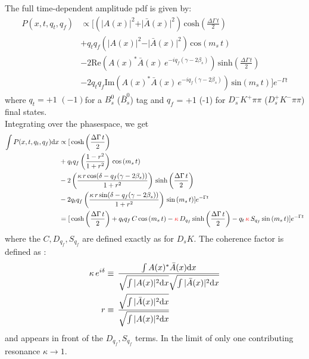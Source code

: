 The full time-dependent amplitude pdf is given by:
\begin{equation}
\begin{split}
\label{eq:PDF_full}
	P(x,t,q_t,q_f) &\propto  [
	 \left( \vert A(x) \vert^2 + \vert \bar A(x) \vert^2 \right) \, \text{cosh} \left( \frac{\Delta \Gamma \, t}{2}\right) \\
	 & + q_t q_f \left( \vert A(x) \vert^2 - \vert \bar A(x) \vert^2 \right) \, \text{cos} \left( m_s \, t \right)  \\
	 & -2 \text{Re}\left( A(x)^{*}  \bar A(x) \, e^{-i q_f (\gamma - 2\beta_s)}  \right) \, \text{sinh} \left( \frac{\Delta \Gamma \, t}{2}\right)  \\
	 & -2 q_t q_f \text{Im}\left( A(x)^{*}  \bar A(x) \, e^{-i q_f (\gamma - 2\beta_s)}  \right)\, \text{sin} \left( m_s \, t \right)  ]  e^{- \Gamma t}
\end{split}
\end{equation}
where $q_t = +1$ $(-1) $for a $B_s^{0}$ ($\bar B_s^{0}$) tag and 
$q_f$ = +1 $ $(-1) for $D_s^{-} K^{+} \pi\pi$ ($D_s^{+} K^{-} \pi\pi$) final states. \\

Integrating over the phasespace, we get
\begin{equation}
\begin{split}
\label{eq:PDF_intX}
	\int P(x,t,q_t,q_f) \text d x &\propto   [
	\, \text{cosh} \left( \frac{\Delta \Gamma \, t}{2}\right) \\
	 & + q_t q_f \left( \frac{1-r^2}{1+r^2} \right) \, \text{cos} \left( m_s \, t \right)  \\
	 & -2 \left( \frac{\kappa \, r \, \text{cos}(\delta - q_f(\gamma - 2 \beta_s))}{1+r^2}  \right) \, \text{sinh} \left( \frac{\Delta \Gamma \, t}{2}\right)  \\
	 & -2 q_t q_f \left( \frac{\kappa \, r \, \text{sin}(\delta - q_f(\gamma - 2 \beta_s))}{1+r^2}   \right)\, \text{sin} \left( m_s \, t \right)  ]  e^{- \Gamma t} \\
	 &=   [
	\, \text{cosh} \left( \frac{\Delta \Gamma \, t}{2}\right) 
	  + q_t q_f \, C \, \text{cos} \left( m_s \, t \right)  
	  - \textcolor{red}{\kappa} \, D_{q_f} \, \text{sinh} \left( \frac{\Delta \Gamma \, t}{2}\right)  
	  - q_t \, \textcolor{red}{\kappa} \, S_{q_f}\, \text{sin} \left( m_s \, t \right)  ]  e^{- \Gamma t}
\end{split}
\end{equation}
where the $C,D_{q_f},S_{q_f}$ are defined exactly as for $D_s K$.
The coherence factor is defined as :
\begin{align}
\label{eq:coherenceFactor}
	\kappa \, e^{i\delta} &\equiv \, \frac{\int A(x)^{*}  \bar A(x)  \text d x}{\sqrt{\int \vert A(x) \vert^2\text d x} \sqrt{\int \vert \bar A(x) \vert^2\text d x}  } \\
	r &\equiv \, \frac{\sqrt{\int \vert \bar A(x) \vert^2\text d x }}{\sqrt{\int \vert A(x) \vert^2\text d x}} 
\end{align}
and appears in front of the $D_{q_f},S_{q_f}$  terms.
In the limit of only one contributing resonance $\kappa \to 1$. \\


